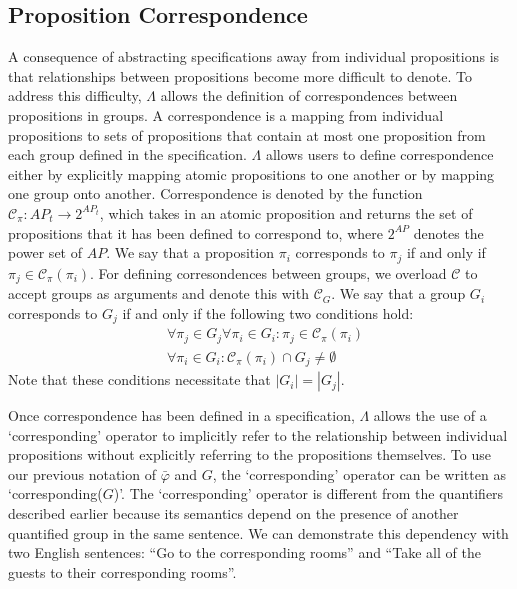 \subsection{Proposition Correspondence} 
A consequence of abstracting specifications away from individual propositions is that relationships between propositions become more difficult to denote. 
To address this difficulty, $\Lambda$ allows the definition of correspondences between propositions in groups. 
A correspondence is a mapping from individual propositions to sets of propositions that contain at most one proposition from each group defined in the specification. 
$\Lambda$ allows users to define correspondence either by explicitly mapping atomic propositions to one another or by mapping one group onto another. 
Correspondence is denoted by the function $\mathcal{C}_\pi: AP_t \rightarrow 2^{AP_t}$, which takes in an atomic proposition and returns the set of propositions that it has been defined to correspond to, where $2^{AP}$ denotes the power set of $AP$. We say that a proposition $\pi_i$ corresponds to $\pi_j$ if and only if $\pi_j \in \mathcal{C}_\pi(\pi_i)$. 
For defining corresondences between groups, we overload $\mathcal{C}$ to accept groups as arguments and denote this with $\mathcal{C}_G$.
We say that a group $G_i$ corresponds to $G_j$ if and only if the following two conditions hold:
\begin{subequations}
\begin{align}
	&\forall \pi_j \in G_j \forall \pi_i \in G_i : \pi_j \in \mathcal{C}_\pi(\pi_i) \\
	&\forall \pi_i \in G_i : \mathcal{C}_\pi(\pi_i) \cap G_j \neq \emptyset
\end{align}
\end{subequations}
Note that these conditions necessitate that $|G_i| = |G_j|$.
\par Once correspondence has been defined in a specification, $\Lambda$ allows the use of a `corresponding' operator to implicitly refer to the relationship between individual propositions without explicitly referring to the propositions themselves. 
To use our previous notation of $\bar{\varphi}$ and $G$, the `corresponding' operator can be written as `corresponding($G$)'. 
The `corresponding' operator is different from the quantifiers described earlier because its semantics depend on the presence of another quantified group in the same sentence. 
We can demonstrate this dependency with two English sentences: ``Go to the corresponding rooms'' and ``Take all of the guests to their corresponding rooms''.
